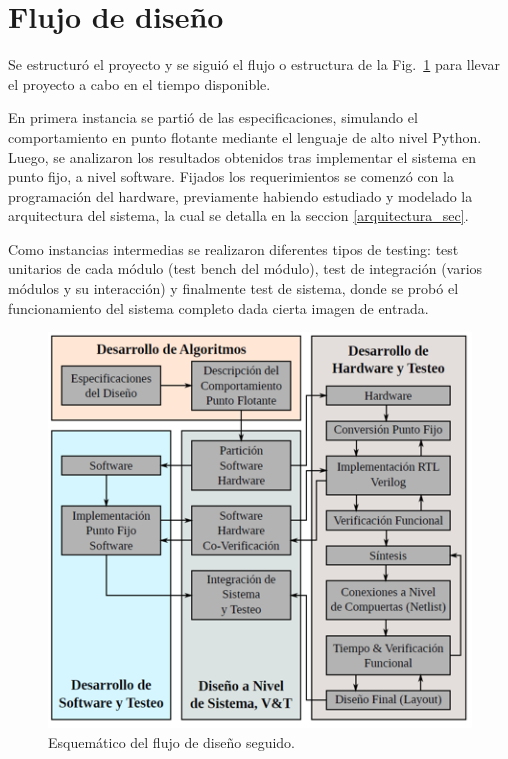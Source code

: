 \section{Flujo de diseño} \label{flujo_subsecc}

Se estructuró el proyecto y se siguió el flujo o estructura de la
Fig.~\ref{design_flow} para llevar el proyecto a cabo en el tiempo disponible.

En primera instancia se partió de las especificaciones, simulando el comportamiento en punto flotante mediante el lenguaje de alto nivel Python. Luego, se analizaron los resultados obtenidos tras implementar el sistema en punto fijo, a nivel software. 
Fijados los requerimientos se comenzó con la programación del hardware,
previamente habiendo estudiado y modelado la arquitectura del sistema, la cual
se detalla en la seccion \ref{arquitectura_sec}.

Como instancias intermedias se realizaron diferentes tipos de testing: test unitarios de cada módulo (test bench del módulo), test de integración (varios módulos y su interacción) y finalmente test de sistema, donde se probó el funcionamiento del sistema completo dada cierta imagen de entrada.

\begin{figure}
\centering
\includegraphics{flujo_de_dis.png}
\caption{Esquemático del flujo de diseño seguido.}
\label{design_flow}
\end{figure}

